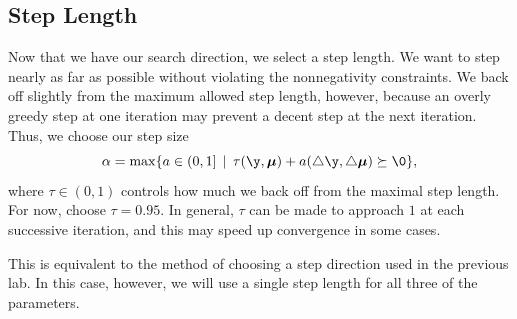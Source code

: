 %

\subsection*{Step Length}
Now that we have our search direction, we select a step length. We want to step nearly as far as possible
without violating the nonnegativity constraints. We back off slightly from the maximum allowed step length, however,
because an overly greedy step at one iteration may prevent a decent step at the next iteration. Thus,
we choose our step size
\[
\alpha = \max\{a \in (0,1] \, \mid \, \tau(\y,\Mu) +a(\triangle \y, \triangle \Mu) \succeq \0\},
\]
where $\tau \in (0,1)$ controls how much we back off from the maximal step length. For now, choose $\tau = 0.95$.
In general, $\tau$ can be made to approach $1$ at each successive iteration, and this may speed up convergence in some cases.

This is equivalent to the method of choosing a step direction used in the previous lab.
In this case, however, we will use a single step length for all three of the parameters.

